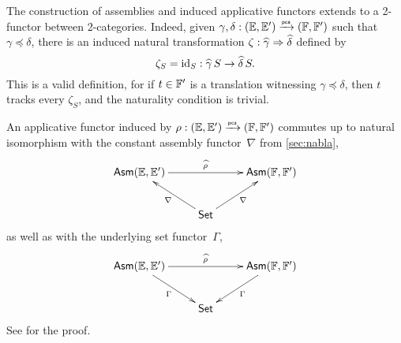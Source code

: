 The construction of assemblies and induced applicative functors extends to a 2-functor between 2-categories. Indeed, given $\gamma, \delta : (\EE, \subEE) \pcato (\FF, \subFF)$ such that $\gamma \preceq \delta$, there is an induced natural transformation $\zeta : \ff{\gamma} \natto \ff{\delta}$ defined by
%
\begin{equation*}
  \zeta_{S} = \id[S] : \ff{\gamma}\,S \to \ff{\delta}\,S.
\end{equation*}
%
This is a valid definition, for if $t \in \subFF$ is a translation witnessing $\gamma \preceq \delta$, then $t$ tracks every $\zeta_{S}$, and the naturality condition is trivial.

An applicative functor induced by $\rho : (\EE, \subEE) \pcato (\FF, \subFF)$ commutes up to natural isomorphism with the constant assembly functor~$\nabla$ from \cref{sec:nabla},
%
\begin{equation*}
  \xymatrix{
    {\Asm{\EE, \subEE}}
    \ar[rr]^{\ff{\rho}}
    & &
    {\Asm{\FF, \subFF}}
    \\
    & {\Set}
    \ar[ur]_{\nabla}
    \ar[ul]^{\nabla}
  }
\end{equation*}
%
as well as with the underlying set functor~$\Gamma$,
%
\begin{equation*}
  \xymatrix{
    {\Asm{\EE, \subEE}}
    \ar[rr]^{\ff{\rho}}
    \ar[dr]_{\Gamma}
    & &
    {\Asm{\FF, \subFF}}
    \ar[dl]^{\Gamma}
    \\
    & {\Set}
  }
\end{equation*}
%
See \cite[Proposition 2.2.4]{Longley:94} for the proof.

